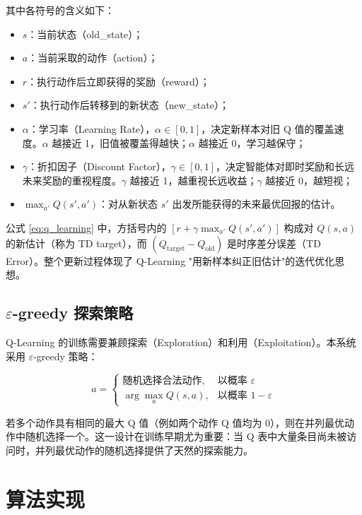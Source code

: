 \documentclass[12pt]{article}
\begin{document}
其中各符号的含义如下：

\begin{itemize}
	\item $s$：当前状态（old\_state）；
	\item $a$：当前采取的动作（action）；
	\item $r$：执行动作后立即获得的奖励（reward）；
	\item $s'$：执行动作后转移到的新状态（new\_state）；
	\item $\alpha$：学习率（Learning Rate），$\alpha \in [0, 1]$，决定新样本对旧 Q 值的覆盖速度。$\alpha$ 越接近 1，旧值被覆盖得越快；$\alpha$ 越接近 0，学习越保守；
	\item $\gamma$：折扣因子（Discount Factor），$\gamma \in [0, 1]$，决定智能体对即时奖励和长远未来奖励的重视程度。$\gamma$ 越接近 1，越重视长远收益；$\gamma$ 越接近 0，越短视；
	\item $\max_{a'} Q(s', a')$：对从新状态 $s'$ 出发所能获得的未来最优回报的估计。
\end{itemize}

公式 \eqref{eq:q_learning} 中，方括号内的 $[r + \gamma \max_{a'} Q(s', a')]$ 构成对 $Q(s, a)$ 的新估计（称为 TD target），而 $(Q_{\text{target}} - Q_{\text{old}})$ 是时序差分误差（TD Error）。整个更新过程体现了 Q-Learning "用新样本纠正旧估计"的迭代优化思想。

\subsection{$\varepsilon$-greedy 探索策略}

Q-Learning 的训练需要兼顾探索（Exploration）和利用（Exploitation）。本系统采用 $\varepsilon$-greedy 策略：

\begin{equation}
	a = \begin{cases}
		\text{随机选择合法动作}, & \text{以概率 } \varepsilon \\
		\arg\max_a Q(s, a),   & \text{以概率 } 1 - \varepsilon
	\end{cases}
	\label{eq:epsilon_greedy}
\end{equation}

若多个动作具有相同的最大 Q 值（例如两个动作 Q 值均为 0），则在并列最优动作中随机选择一个。这一设计在训练早期尤为重要：当 Q 表中大量条目尚未被访问时，并列最优动作的随机选择提供了天然的探索能力。

\section{算法实现}
\end{document}
